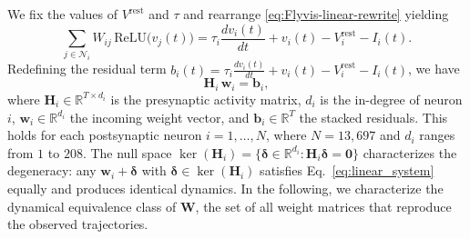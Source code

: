 \documentclass{article}
\def\vrest{V^{\mathrm{rest}}}
\begin{document}

We fix the values of $\vrest$ and $\tau$ and rearrange \cref{eq:Flyvis-linear-rewrite} yielding
\begin{equation}
  \sum_{j\in\mathcal{N}_i} W_{ij}\,\text{ReLU}\!\big(v_j(t)\big)
  = \tau_i \frac{dv_i(t)}{dt} + v_i(t) - V_i^{\text{rest}} - I_i(t).
\end{equation}
Redefining the residual term $b_i(t) = \tau_i \frac{dv_i(t)}{dt} + v_i(t) - V_i^{\text{rest}} - I_i(t)$, we have 
\begin{equation}
  \mathbf{H}_i\,\mathbf{w}_i = \mathbf{b}_i,
  \label{eq:linear_system}
\end{equation}
where $\mathbf{H}_i \in \mathbb{R}^{T \times d_i}$ is the presynaptic
activity matrix, $d_i$ is the in-degree of neuron $i$, $\mathbf{w}_i \in
\mathbb{R}^{d_i}$ the incoming weight vector, and $\mathbf{b}_i \in
\mathbb{R}^T$ the stacked residuals. This holds for each postsynaptic neuron
$i = 1, \ldots, N$, where $N = 13{,}697$ and $d_i$ ranges from $1$ to $208$.
The null space $\ker(\mathbf{H}_i) = \{\boldsymbol{\delta} \in \mathbb{R}^{d_i}
: \mathbf{H}_i\boldsymbol{\delta} = \mathbf{0}\}$ characterizes the
degeneracy: any $\mathbf{w}_i + \boldsymbol{\delta}$ with $\boldsymbol{\delta}
\in \ker(\mathbf{H}_i)$ satisfies Eq.~\eqref{eq:linear_system} equally and
produces identical dynamics. In the following, we characterize the
dynamical equivalence class of $\mathbf{W}$, the set of all weight
matrices that reproduce the observed trajectories.
\end{document}
